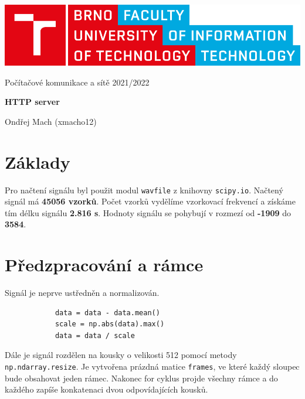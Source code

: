 \documentclass[12pt,a4paper]{article}
\begin{document}
	\begin{titlepage}
		\begin{center}
			\includegraphics[width=0.5\linewidth]{img/logo.pdf}
			\vspace{3cm}
			
			\LARGE{Počítačové komunikace a sítě 2021/2022}
			\vspace{1cm}
			
			\LARGE\textbf{HTTP server}
			
			\vspace*{\fill}
			\large{Ondřej Mach (xmacho12)}
		\end{center}
	\end{titlepage}
	
	

	\section{Základy}
		Pro načtení signálu byl použit modul \texttt{wavfile} z knihovny \texttt{scipy.io}.
		Načtený signál má \textbf{45056 vzorků}.
		Počet vzorků vydělíme vzorkovací frekvencí a získáme tím délku signálu \textbf{2.816 s}.
		Hodnoty signálu se pohybují v rozmezí od \textbf{-1909} do \textbf{3584}.
	
	
	\section{Předzpracování a rámce}
		Signál je neprve ustředněn a normalizován.
		
		\begin{verbatim}
			data = data - data.mean()
			scale = np.abs(data).max()
			data = data / scale
		\end{verbatim}
		
		Dále je signál rozdělen na kousky o velikosti 512 pomocí metody \texttt{np.ndarray.resize}. 
		Je vytvořena prázdná matice \texttt{frames}, ve které každý sloupec bude obsahovat jeden rámec.
		Nakonec for cyklus projde všechny rámce a do každého zapíše konkatenaci dvou odpovídajících kousků.
		
		
	
	
\end{document}
